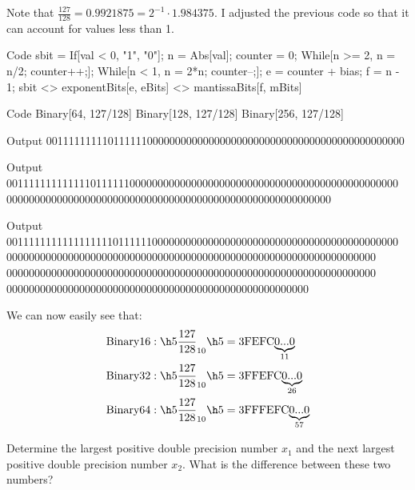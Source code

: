 \documentclass[11pt,twoside,openany]{memoir}
\begin{document}
        \begin{solution}
            Note that $\frac{127}{128} = 0.9921875 = 2^{-1} \cdot 1.984375$. I adjusted the previous code so that it can account for values less than 1.
            
\begin{mmaCell}[functionlocal=y]{Code}
sbit = If[val < 0, "1", "0"];
n = Abs[val];
counter = 0;
While[n >= 2, n = n/2;
  counter++;];
While[n < 1, n = 2*n;
  counter--;];
e = counter + bias;
f = n - 1;
sbit <> exponentBits[e, eBits] <> mantissaBits[f, mBits]
\end{mmaCell}
\begin{mmaCell}[functionlocal=y]{Code}
Binary[64, 127/128]
Binary[128, 127/128]
Binary[256, 127/128]
\end{mmaCell}
\begin{mmaCell}{Output}
0011111111101111110000000000000000000000000000000000000000000000
\end{mmaCell}
\begin{mmaCell}{Output}
0011111111111110111111000000000000000000000000000000000000000000000000
    0000000000000000000000000000000000000000000000000000000000
\end{mmaCell}
\begin{mmaCell}{Output}
0011111111111111111011111100000000000000000000000000000000000000000000
    000000000000000000000000000000000000000000000000000000000000000000
    000000000000000000000000000000000000000000000000000000000000000000
    000000000000000000000000000000000000000000000000000000
\end{mmaCell}
            We can now easily see that:
                \begin{equation*}
                \begin{split}
                    \text{Binary}16:\h5 \frac{127}{128}_{10}\h5 &= 3\text{FEFC}{\underbrace{0...0}_{11}} \\
                    \text{Binary}32:\h5 \frac{127}{128}_{10}\h5 &=3\text{FFEFC}{\underbrace{0...0}_{26}} \\
                    \text{Binary}64:\h5 \frac{127}{128}_{10}\h5 &= 3\text{FFFEFC}{\underbrace{0...0}_{57}} \\
                \end{split}
                \end{equation*}
        \end{solution}
    \begin{problem}
        Determine the largest positive double precision number $x_1$ and the next largest positive double precision number $x_2$. What is the difference between these two numbers?
    \end{problem}
\end{document}
